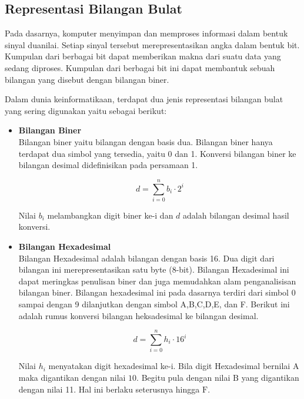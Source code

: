 \documentclass[10pt,conference]{IEEEtran}
\theoremstyle{definition}
\begin{document}
\subsection{Representasi Bilangan Bulat}
Pada dasarnya, komputer menyimpan dan memproses informasi dalam bentuk sinyal duanilai. Setiap sinyal tersebut merepresentasikan angka 
dalam bentuk bit. Kumpulan dari berbagai bit dapat memberikan makna dari suatu data  yang sedang diproses. Kumpulan dari berbagai bit ini 
dapat membantuk sebuah bilangan yang disebut dengan bilangan biner.

Dalam dunia keinformatikaan, terdapat dua jenis representasi bilangan bulat yang sering digunakan yaitu sebagai berikut:
\begin{itemize}
    \item \textbf{Bilangan Biner} \\
    Bilangan biner yaitu bilangan dengan basis dua. Bilangan biner hanya terdapat dua simbol yang tersedia, yaitu 0 dan 1. Konversi bilangan 
    biner ke bilangan desimal didefinisikan pada persamaan 1.
    
    \begin{equation}
         d = \sum_{i=0}^{n} b_i \cdot 2^{i}
    \end{equation}

    Nilai $ b_i $ melambangkan digit biner ke-i dan $ d $ adalah bilangan desimal hasil konversi. \\


    \item \textbf{Bilangan Hexadesimal} \\
    Bilangan Hexadesimal adalah bilangan dengan basis 16. Dua digit dari bilangan ini merepresentasikan satu byte (8-bit). Bilangan Hexadesimal 
    ini dapat meringkas penulisan biner dan juga memudahkan alam penganalisisan bilangan biner. Bilangan hexadesimal ini pada dasarnya terdiri 
    dari simbol 0 sampai dengan 9 dilanjutkan dengan simbol A,B,C,D,E, dan F. Berikut ini adalah rumus konversi bilangan heksadesimal ke bilangan desimal.

    \begin{equation}
        d = \sum_{i=0}^n h_i \cdot 16^{i}
    \end{equation}

    Nilai $ h_i $ menyatakan digit hexadesimal ke-i. Bila digit Hexadesimal bernilai $ \text{A} $ maka digantikan dengan nilai $ 10 $. Begitu 
    pula dengan nilai $ \text{B} $ yang digantikan dengan nilai 11. Hal ini berlaku seterusnya hingga $ \text{F} $.
\end{itemize}
\end{document}
